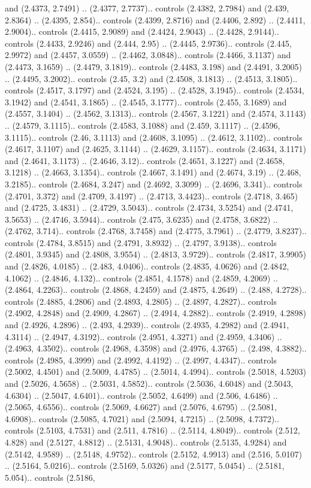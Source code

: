 and (2.4373, 2.7491) .. (2.4377, 2.7737).. controls (2.4382, 2.7984) and (2.439, 2.8364) .. (2.4395, 2.854).. controls (2.4399, 2.8716) and (2.4406, 2.892) .. (2.4411, 2.9004).. controls (2.4415, 2.9089) and (2.4424, 2.9043) .. (2.4428, 2.9144).. controls (2.4433, 2.9246) and (2.444, 2.95) .. (2.4445, 2.9736).. controls (2.445, 2.9972) and (2.4457, 3.0559) .. (2.4462, 3.0848).. controls (2.4466, 3.1137) and (2.4473, 3.1659) .. (2.4479, 3.1819).. controls (2.4483, 3.198) and (2.4491, 3.2005) .. (2.4495, 3.2002).. controls (2.45, 3.2) and (2.4508, 3.1813) .. (2.4513, 3.1805).. controls (2.4517, 3.1797) and (2.4524, 3.195) .. (2.4528, 3.1945).. controls (2.4534, 3.1942) and (2.4541, 3.1865) .. (2.4545, 3.1777).. controls (2.455, 3.1689) and (2.4557, 3.1404) .. (2.4562, 3.1313).. controls (2.4567, 3.1221) and (2.4574, 3.1143) .. (2.4579, 3.1115).. controls (2.4583, 3.1088) and (2.459, 3.1117) .. (2.4596, 3.1115).. controls (2.46, 3.1113) and (2.4608, 3.1095) .. (2.4612, 3.1102).. controls (2.4617, 3.1107) and (2.4625, 3.1144) .. (2.4629, 3.1157).. controls (2.4634, 3.1171) and (2.4641, 3.1173) .. (2.4646, 3.12).. controls (2.4651, 3.1227) and (2.4658, 3.1218) .. (2.4663, 3.1354).. controls (2.4667, 3.1491) and (2.4674, 3.19) .. (2.468, 3.2185).. controls (2.4684, 3.247) and (2.4692, 3.3099) .. (2.4696, 3.341).. controls (2.4701, 3.372) and (2.4709, 3.4197) .. (2.4713, 3.4423).. controls (2.4718, 3.465) and (2.4725, 3.4831) .. (2.4729, 3.5043).. controls (2.4734, 3.5254) and (2.4741, 3.5653) .. (2.4746, 3.5944).. controls (2.475, 3.6235) and (2.4758, 3.6822) .. (2.4762, 3.714).. controls (2.4768, 3.7458) and (2.4775, 3.7961) .. (2.4779, 3.8237).. controls (2.4784, 3.8515) and (2.4791, 3.8932) .. (2.4797, 3.9138).. controls (2.4801, 3.9345) and (2.4808, 3.9554) .. (2.4813, 3.9729).. controls (2.4817, 3.9905) and (2.4826, 4.0185) .. (2.483, 4.0406).. controls (2.4835, 4.0626) and (2.4842, 4.1062) .. (2.4846, 4.132).. controls (2.4851, 4.1578) and (2.4859, 4.2069) .. (2.4864, 4.2263).. controls (2.4868, 4.2459) and (2.4875, 4.2649) .. (2.488, 4.2728).. controls (2.4885, 4.2806) and (2.4893, 4.2805) .. (2.4897, 4.2827).. controls (2.4902, 4.2848) and (2.4909, 4.2867) .. (2.4914, 4.2882).. controls (2.4919, 4.2898) and (2.4926, 4.2896) .. (2.493, 4.2939).. controls (2.4935, 4.2982) and (2.4941, 4.3114) .. (2.4947, 4.3192).. controls (2.4951, 4.3271) and (2.4959, 4.3406) .. (2.4963, 4.3502).. controls (2.4968, 4.3598) and (2.4976, 4.3765) .. (2.498, 4.3882).. controls (2.4985, 4.3999) and (2.4992, 4.4192) .. (2.4997, 4.4347).. controls (2.5002, 4.4501) and (2.5009, 4.4785) .. (2.5014, 4.4994).. controls (2.5018, 4.5203) and (2.5026, 4.5658) .. (2.5031, 4.5852).. controls (2.5036, 4.6048) and (2.5043, 4.6304) .. (2.5047, 4.6401).. controls (2.5052, 4.6499) and (2.506, 4.6486) .. (2.5065, 4.6556).. controls (2.5069, 4.6627) and (2.5076, 4.6795) .. (2.5081, 4.6908).. controls (2.5085, 4.7021) and (2.5094, 4.7215) .. (2.5098, 4.7372).. controls (2.5103, 4.7531) and (2.511, 4.7816) .. (2.5114, 4.8049).. controls (2.512, 4.828) and (2.5127, 4.8812) .. (2.5131, 4.9048).. controls (2.5135, 4.9284) and (2.5142, 4.9589) .. (2.5148, 4.9752).. controls (2.5152, 4.9913) and (2.516, 5.0107) .. (2.5164, 5.0216).. controls (2.5169, 5.0326) and (2.5177, 5.0454) .. (2.5181, 5.054).. controls (2.5186, 